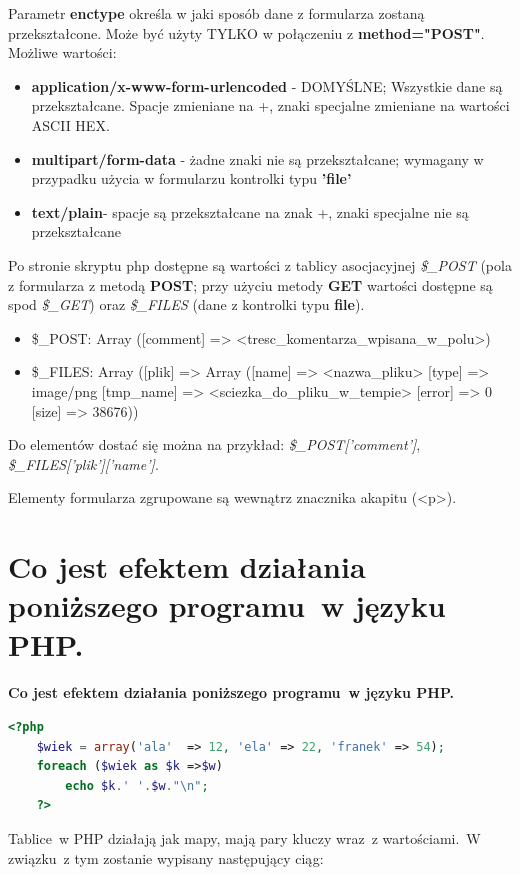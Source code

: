 Parametr \textbf{enctype} określa w jaki sposób dane z formularza zostaną przekształcone. Może być użyty TYLKO w połączeniu z \textbf{method="POST"}.
	Możliwe wartości:
\begin{itemize}
\item
\textbf{application/x-www-form-urlencoded} - DOMYŚLNE; Wszystkie dane są przekształcane. Spacje zmieniane na +, znaki specjalne zmieniane na wartości ASCII HEX.
\item
\textbf{multipart/form-data} - żadne znaki nie są przekształcane; wymagany w przypadku użycia w formularzu kontrolki typu \textbf{'file'}
\item
\textbf{text/plain}- spacje są przekształcane na znak +, znaki specjalne nie są przekształcane
\end{itemize}

Po stronie skryptu php dostępne są wartości z tablicy asocjacyjnej \textit{\$\_POST} (pola z formularza z metodą \textbf{POST}; przy użyciu metody \textbf{GET} wartości dostępne są spod \textit{\$\_GET}) oraz \textit{\$\_FILES} (dane z kontrolki typu \textbf{file}).

\begin{itemize}
\item
\$\_POST: Array ([comment] => <tresc\_komentarza\_wpisana\_w\_polu>)
\item
\$\_FILES: Array ([plik] => Array ([name] => <nazwa\_pliku> [type] => image/png [tmp\_name] => <sciezka\_do\_pliku\_w\_tempie> [error] => 0 [size] => 38676))
\end{itemize}
Do elementów dostać się można na przykład: \textit{\$\_POST['comment']}, \textit{\$\_FILES['plik']['name']}.

Elementy formularza zgrupowane są wewnątrz znacznika akapitu (<p>).

\section{Co jest efektem działania poniższego programu~w języku PHP.}
\textbf{Co jest efektem działania poniższego programu~w języku PHP.}
\begin{lstlisting}[language=php]
	<?php
	$wiek = array('ala'  => 12, 'ela' => 22, 'franek' => 54);
	foreach ($wiek as $k =>$w)
		echo $k.' '.$w."\n";
	?>
\end{lstlisting}
\vspace{0.4cm}
\noindent
Tablice~w PHP działają jak mapy, mają pary kluczy wraz~z wartościami.~W związku~z tym zostanie wypisany następujący ciąg:

